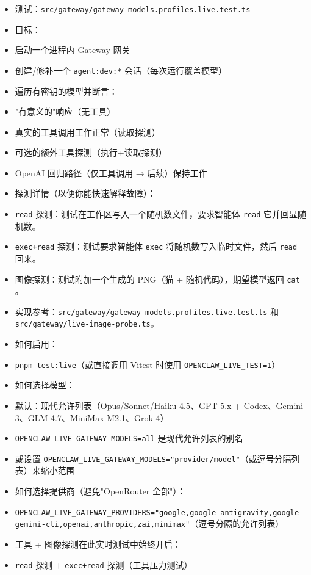 \begin{itemize}
  \item 测试：\texttt{src/gateway/gateway-models.profiles.live.test.ts}
  \item 目标：
  \item 启动一个进程内 Gateway 网关
  \item 创建/修补一个 \texttt{agent:dev:*} 会话（每次运行覆盖模型）
  \item 遍历有密钥的模型并断言：
  \item "有意义的"响应（无工具）
  \item 真实的工具调用工作正常（读取探测）
  \item 可选的额外工具探测（执行+读取探测）
  \item OpenAI 回归路径（仅工具调用 → 后续）保持工作
  \item 探测详情（以便你能快速解释故障）：
  \item \texttt{read} 探测：测试在工作区写入一个随机数文件，要求智能体 \texttt{read} 它并回显随机数。
  \item \texttt{exec+read} 探测：测试要求智能体 \texttt{exec} 将随机数写入临时文件，然后 \texttt{read} 回来。
  \item 图像探测：测试附加一个生成的 PNG（猫 + 随机代码），期望模型返回 \texttt{cat }。
  \item 实现参考：\texttt{src/gateway/gateway-models.profiles.live.test.ts} 和 \texttt{src/gateway/live-image-probe.ts}。
  \item 如何启用：
  \item \texttt{pnpm test:live}（或直接调用 Vitest 时使用 \texttt{OPENCLAW\_LIVE\_TEST=1}）
  \item 如何选择模型：
  \item 默认：现代允许列表（Opus/Sonnet/Haiku 4.5、GPT-5.x + Codex、Gemini 3、GLM 4.7、MiniMax M2.1、Grok 4）
  \item \texttt{OPENCLAW\_LIVE\_GATEWAY\_MODELS=all} 是现代允许列表的别名
  \item 或设置 \texttt{OPENCLAW\_LIVE\_GATEWAY\_MODELS="provider/model"}（或逗号分隔列表）来缩小范围
  \item 如何选择提供商（避免"OpenRouter 全部"）：
  \item \texttt{OPENCLAW\_LIVE\_GATEWAY\_PROVIDERS="google,google-antigravity,google-gemini-cli,openai,anthropic,zai,minimax"}（逗号分隔的允许列表）
  \item 工具 + 图像探测在此实时测试中始终开启：
  \item \texttt{read} 探测 + \texttt{exec+read} 探测（工具压力测试）

\end{itemize}
